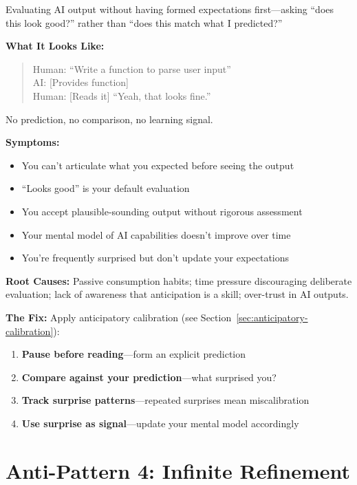 Evaluating AI output without having formed expectations first---asking ``does this look good?'' rather than ``does this match what I predicted?''

\textbf{What It Looks Like:}

\begin{quote}
Human: ``Write a function to parse user input''\\
AI: [Provides function]\\
Human: [Reads it] ``Yeah, that looks fine.''
\end{quote}

No prediction, no comparison, no learning signal.

\textbf{Symptoms:}
\begin{itemize}
    \item You can't articulate what you expected before seeing the output
    \item ``Looks good'' is your default evaluation
    \item You accept plausible-sounding output without rigorous assessment
    \item Your mental model of AI capabilities doesn't improve over time
    \item You're frequently surprised but don't update your expectations
\end{itemize}

\textbf{Root Causes:} Passive consumption habits; time pressure discouraging deliberate evaluation; lack of awareness that anticipation is a skill; over-trust in AI outputs.

\textbf{The Fix:} Apply anticipatory calibration (see Section~\ref{sec:anticipatory-calibration}):
\begin{enumerate}
    \item \textbf{Pause before reading}---form an explicit prediction
    \item \textbf{Compare against your prediction}---what surprised you?
    \item \textbf{Track surprise patterns}---repeated surprises mean miscalibration
    \item \textbf{Use surprise as signal}---update your mental model accordingly
\end{enumerate}

\section{Anti-Pattern 4: Infinite Refinement}

